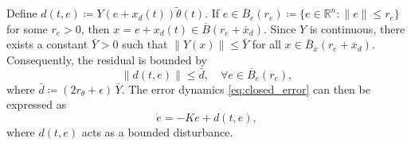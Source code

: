 \documentclass[conference]{ieeeconf}
\begin{document}
Define $d(t, e) \coloneqq Y(e + x_{d}(t))\tilde{\theta}(t)$. If $e \in \overline{B}_{e}(r_{e}) \coloneqq \{e \in \mathbb{R}^{n}: \|e\|\leq r_e\}$ for some $r_e > 0$, then $x = e + x_{d}(t) \in \overline{B}(r_{e} + \overline{x}_{d})$.  Since $Y$ is continuous, there exists a constant $\bar Y > 0$ such that $\|Y(x)\| \le \bar Y$ for all $x \in \overline{B}_{x}(r_{e} + \overline{x}_{d}) $. Consequently, the residual is bounded by
\begin{equation}
    \|d(t,e)\| \le   \bar d, \quad \forall e \in \overline{B}_{e}(r_{e}),
\end{equation}
where $\bar d \coloneqq (2  r_{\theta} + \epsilon)\,\bar Y$. The error dynamics \eqref{eq:closed_error} can then be expressed as
\begin{equation}\label{eq:error_vector_field}
    \dot e = -K e + d(t,e),
\end{equation}
where $d(t,e)$ acts as a bounded disturbance.
\end{document}
